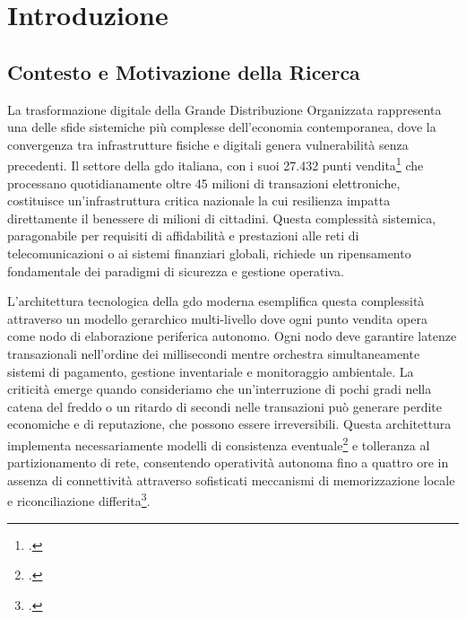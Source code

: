 \chapter{\texorpdfstring{Introduzione}{Capitolo 1 - Introduzione}}
\label{cap:introduzione}

\section{\texorpdfstring{Contesto e Motivazione della Ricerca}{1.1 - Contesto e Motivazione della Ricerca}}
\label{sec:contesto_motivazione}

La trasformazione digitale della Grande Distribuzione Organizzata rappresenta una delle sfide sistemiche più complesse dell'economia contemporanea, dove la convergenza tra infrastrutture fisiche e digitali genera vulnerabilità senza precedenti. Il settore della \gls{gdo} italiana, con i suoi 27.432 punti vendita\footcite{istat2024} che processano quotidianamente oltre 45 milioni di transazioni elettroniche, costituisce un'infrastruttura critica nazionale la cui resilienza impatta direttamente il benessere di milioni di cittadini. Questa complessità sistemica, paragonabile per requisiti di affidabilità e prestazioni alle reti di telecomunicazioni o ai sistemi finanziari globali, richiede un ripensamento fondamentale dei paradigmi di sicurezza e gestione operativa.

L'architettura tecnologica della \gls{gdo} moderna esemplifica questa complessità attraverso un modello gerarchico multi-livello dove ogni punto vendita opera come nodo di elaborazione periferica autonomo. Ogni nodo deve garantire latenze transazionali nell'ordine dei millisecondi mentre orchestra simultaneamente sistemi di pagamento, gestione inventariale e monitoraggio ambientale. La criticità emerge quando consideriamo che un'interruzione di pochi gradi nella catena del freddo o un ritardo di secondi nelle transazioni può generare perdite economiche e di reputazione, che possono essere irreversibili. Questa architettura implementa necessariamente modelli di consistenza eventuale\footcite{vogels2009} e tolleranza al partizionamento di rete, consentendo operatività autonoma fino a quattro ore in assenza di connettività attraverso sofisticati meccanismi di memorizzazione locale e riconciliazione differita\footcite{Osservatorio2024}.


